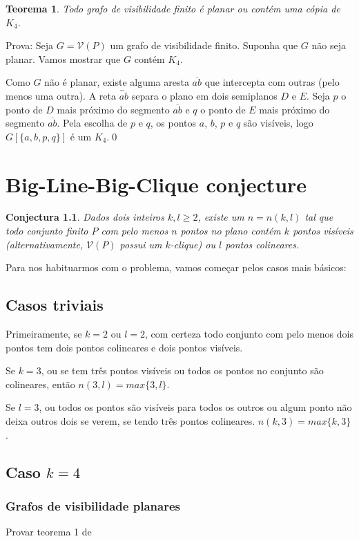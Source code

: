 \documentclass[a4paper]{book}
\newtheorem{conjecture}{Conjectura}
\newtheorem{teorema}{Teorema}
\begin{document}
\begin{teorema}\cite{visibility}
    Todo grafo de visibilidade finito é planar ou contém uma cópia de $K_4$.
\end{teorema}
Prova:
Seja $G=\mathcal V(P)$ um grafo de visibilidade finito. Suponha que $G$ não seja planar. Vamos mostrar que $G$ contém $K_4$.

Como $G$ não é planar, existe alguma aresta $\overline{ab}$ que intercepta com outras (pelo menos uma outra). A reta $\overleftrightarrow{ab}$ separa o plano em dois semiplanos $D$ e $E$. Seja $p$ o ponto de $D$ mais próximo do segmento $\overline{ab}$ e $q$ o ponto de $E$ mais próximo do segmento $\overline{ab}$. Pela escolha de $p$ e $q$, os pontos $a$, $b$, $p$ e $q$ são visíveis, logo $G[\{a,b,p,q\}]$ é um $K_4$.\qed



\chapter{Big-Line-Big-Clique conjecture}

\begin{conjecture}
    Dados dois inteiros $k,l\geq2$, existe um $n=n(k,l)$ tal que todo conjunto finito $P$ com pelo menos $n$ pontos no plano contém $k$ pontos visíveis (alternativamente, $\mathcal V(P)$ possui um $k$-clique) ou $l$ pontos colineares.
\end{conjecture}

Para nos habituarmos com o problema, vamos começar pelos casos mais básicos:

\section{Casos triviais}
Primeiramente, se $k=2$ ou $l=2$, com certeza todo conjunto com pelo menos dois pontos tem dois pontos colineares e dois pontos visíveis.

Se $k=3$, ou se tem três pontos visíveis ou todos os pontos no conjunto são colineares, então $n(3,l)=max\{3,l\}$.

Se $l=3$, ou todos os pontos são visíveis para todos os outros ou algum ponto não deixa outros dois se verem, se tendo três pontos colineares. $n(k,3) = max\{k,3\}$.


\section{Caso $k=4$}
\subsection{Grafos de visibilidade planares}
Provar teorema 1 de \cite{planar}
\cite{visibilitygraph}
\end{document}
